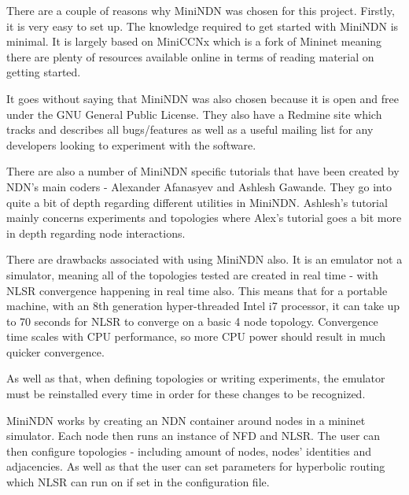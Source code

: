 There are a couple of reasons why MiniNDN was chosen for this project. Firstly, it is very easy to set up. The knowledge required to get started with MiniNDN is minimal. It is largely based on MiniCCNx which is a fork of  Mininet meaning there are plenty of resources available online in terms of reading material on getting started.

It goes without saying that MiniNDN was also chosen because it is open and free under the GNU General Public License. They also have a Redmine site which tracks and describes all bugs/features as well as a useful mailing list for any developers looking to experiment with the software.

 There are also a number of MiniNDN specific tutorials that have been created by NDN's main coders - Alexander Afanasyev and Ashlesh Gawande. They go into quite a bit of depth regarding different utilities in MiniNDN. Ashlesh's tutorial mainly concerns experiments and topologies where Alex's tutorial goes a bit more in depth regarding node interactions. 
 
 There are drawbacks associated with using MiniNDN also. It is an emulator not a simulator, meaning all of the topologies tested are created in real time - with NLSR convergence happening in real time also. This means that for a portable machine, with an 8th generation hyper-threaded Intel i7 processor, it can take up to 70 seconds for NLSR to converge on a basic 4 node topology. Convergence time scales with CPU performance, so more CPU power should result in much quicker convergence. 
 
 As well as that, when defining topologies or writing experiments, the emulator must be reinstalled every time in order for these changes to be recognized.
 
 MiniNDN works by creating an NDN container around nodes in a mininet simulator. Each node then runs an instance of NFD and NLSR. The user can then configure topologies - including amount of nodes, nodes' identities and adjacencies. As well as that the user can set parameters for hyperbolic routing which NLSR can run on if set in the configuration file. 
 
